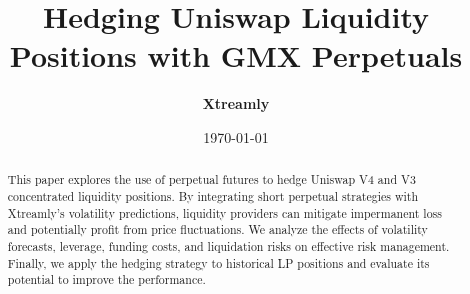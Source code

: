 \documentclass[10pt]{article}
\begin{document}
\title{\textbf{Hedging Uniswap Liquidity Positions with GMX Perpetuals}}
\author{\textbf{Xtreamly}}
\date{\today}
\maketitle

\begin{abstract}
	This paper explores the use of perpetual futures to hedge Uniswap V4 and V3 concentrated liquidity positions. By integrating short perpetual strategies with Xtreamly’s volatility predictions, liquidity providers can mitigate impermanent loss and potentially profit from price fluctuations. We analyze the effects of volatility forecasts, leverage, funding costs, and liquidation risks on effective risk management. Finally, we apply the hedging strategy to historical LP positions and evaluate its potential to improve the performance.
\end{abstract}
\medskip
\end{document}
